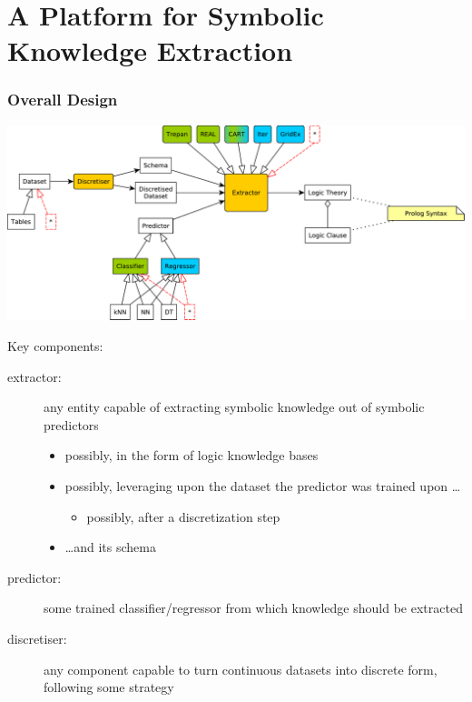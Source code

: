 \documentclass[presentation]{beamer}\mode<presentation>{\usetheme{AMSBolognaFC}}
\begin{document}
\section{A Platform for Symbolic Knowledge Extraction}

\begin{frame}[allowframebreaks]
\frametitle{Overall Design}

    \begin{center}
        \includegraphics[width=\linewidth]{figures/Psyke.pdf}
    \end{center}

    \framebreak

    Key components:
    \begin{description}
        \item[extractor:] any entity capable of extracting symbolic knowledge out of symbolic predictors
        \begin{itemize}
            \item possibly, in the form of logic \alert{knowledge bases}
            \item possibly, leveraging upon the \alert{dataset} the predictor was trained upon \ldots
            \begin{itemize}
                \item possibly, after a \alert{discretization} step
            \end{itemize}
            \item \ldots and its \alert{schema}
        \end{itemize}

        \item[predictor:] some trained classifier/regressor from which knowledge should be extracted
        
        \item[discretiser:] any component capable to turn continuous datasets into discrete form, following some strategy
        

\end{description}
\end{frame}
\end{document}
